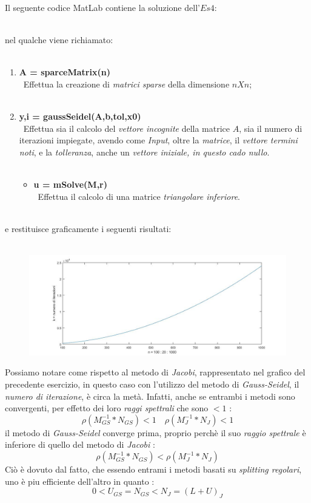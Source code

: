Il seguente codice MatLab contiene la soluzione dell'$Es 4$:\\\
	
nel qualche viene richiamato:\\\
	\begin{enumerate}
		\item \textbf{A = sparceMatrix(n)}\\\
			Effettua la creazione di \textit{matrici sparse} della dimensione $nXn$;\\\
		\item \textbf{y,i = gaussSeidel(A,b,tol,x0)}\\\
			Effettua sia il calcolo del \textit{vettore incognite} della matrice $A$, sia il numero di iterazioni impiegate, avendo come \textit{Input}, oltre la 	\textit{matrice}, il \textit{vettore termini noti}, e la \textit{tolleranza}, anche un \textit{vettore iniziale, in questo cado nullo}.\\\
			
			\begin{itemize}
				\item \textbf{u = mSolve(M,r)}\\\
					Effettua il calcolo di una matrice \textit{triangolare inferiore}.\\\
					
			\end{itemize}
	\end{enumerate}
e restituisce graficamente i seguenti risultati:\\\
	\begin{figure}[H]
		\includegraphics[width=\textwidth]{Plot/Cap_6_Es_4}
	\end{figure}
Possiamo notare come rispetto al metodo di \textit{Jacobi}, rappresentato nel grafico del precedente esercizio, in questo caso con l'utilizzo del metodo di \textit{Gauss-Seidel}, il \textit{numero di iterazione}, è circa la metà. Infatti, anche se entrambi i metodi sono convergenti, per effetto dei loro \textit{raggi spettrali} che sono $<1$ :
	\[
		\rho(M^{-1}_{GS}*N_{GS})<1 \quad \rho(M^{-1}_{J}*N_{J})<1
	\]
il metodo di \textit{Gauss-Seidel} converge prima, proprio perchè il suo \textit{raggio spettrale} è inferiore di quello del metodo di \textit{Jacobi} :
	\[
		\rho(M^{-1}_{GS}*N_{GS})<\rho(M^{-1}_{J}*N_{J})
	\]
Ciò è dovuto dal fatto, che essendo entrami i metodi basati su \textit{splitting regolari}, uno è piu efficiente dell'altro in quanto :
	\[
		0<U_{GS}=N_{GS}<N_{J}=(L+U)_{J}
	\]

